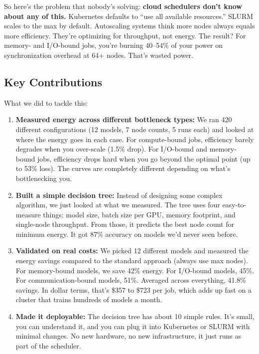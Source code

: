 \documentclass[conference]{IEEEtran}
\begin{document}
So here's the problem that nobody's solving: \textbf{cloud schedulers don't know about any of this.} Kubernetes defaults to ``use all available resources.'' SLURM scales to the max by default. Autoscaling systems think more nodes always equals more efficiency. They're optimizing for throughput, not energy. The result? For memory- and I/O-bound jobs, you're burning 40--54\% of your power on synchronization overhead at 64+ nodes. That's wasted power.

\subsection{Key Contributions}

What we did to tackle this:

\begin{enumerate}
\item \textbf{Measured energy across different bottleneck types:} We ran 420 different configurations (12 models, 7 node counts, 5 runs each) and looked at where the energy goes in each case. For compute-bound jobs, efficiency barely degrades when you over-scale (1.5\% drop). For I/O-bound and memory-bound jobs, efficiency drops hard when you go beyond the optimal point (up to 53\% loss). The curves are completely different depending on what's bottlenecking you.

\item \textbf{Built a simple decision tree:} Instead of designing some complex algorithm, we just looked at what we measured. The tree uses four easy-to-measure things: model size, batch size per GPU, memory footprint, and single-node throughput. From those, it predicts the best node count for minimum energy. It got 87\% accuracy on models we'd never seen before.

\item \textbf{Validated on real costs:} We picked 12 different models and measured the energy savings compared to the standard approach (always use max nodes). For memory-bound models, we save 42\% energy. For I/O-bound models, 45\%. For communication-bound models, 51\%. Averaged across everything, 41.8\% savings. In dollar terms, that's \$357 to \$723 per job, which adds up fast on a cluster that trains hundreds of models a month.

\item \textbf{Made it deployable:} The decision tree has about 10 simple rules. It's small, you can understand it, and you can plug it into Kubernetes or SLURM with minimal changes. No new hardware, no new infrastructure, it just runs as part of the scheduler.
\end{enumerate}
\end{document}

